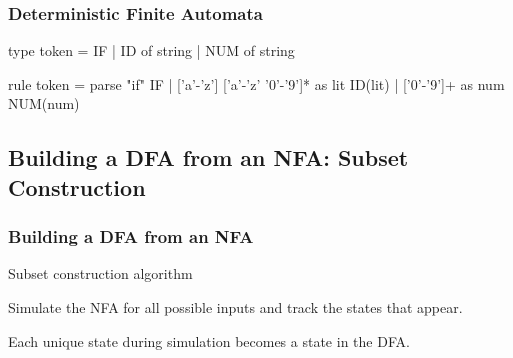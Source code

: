 \documentclass{plt}
\begin{document}
\begin{frame}[fragile]
  \frametitle{Deterministic Finite Automata}

\begin{ocamllex}
{ type token = IF | ID of string | NUM of string }

rule token =
  parse "if"                                { IF }
      | ['a'-'z'] ['a'-'z' '0'-'9']* as lit { ID(lit) }
      | ['0'-'9']+                   as num { NUM(num) }
\end{ocamllex}


\end{frame}

\subsection{Building a DFA from an NFA: Subset Construction}

\begin{frame}
  \frametitle{Building a DFA from an NFA}

Subset construction algorithm

Simulate the NFA for all possible inputs and track the states that
appear.

Each unique state during simulation becomes a state in the DFA.

\end{frame}

\def\aabb#1#2#3#4#5#6#7#8#9{
\begin{scope}[node distance=3pt and 2pt,
                      every state/.style={inner sep=1pt,
                        fill=white,
                        minimum size=5pt}]
    \node [state,fill=\filled#2] at ($(#1)+(left:1)$) (0) {};
    \node [state,fill=\filled#3,right=of 0] (1) {};
    \node [state,fill=\filled#4,above right=of 1] (2) {};
    \node [state,fill=\filled#5,right=of 2] (3) {};
    \node [state,fill=\filled#6,below right=of 1] (4) {};
    \node [state,fill=\filled#7,right=of 4] (5) {};
    \node [state,fill=\filled#8,below right=of 3] (6) {};
    \node [state,fill=\filled#9,right=of 6] (7) {};
\aabbtwo
}
\end{document}

